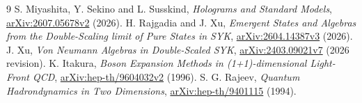\documentclass[11pt]{article}
\begin{document}
\begin{thebibliography}{9}
 S. Miyashita, Y. Sekino and L. Susskind,
\emph{Holograms and Standard Models},
\href{https://arxiv.org/abs/2607.05678v2}{arXiv:2607.05678v2} (2026).
 H. Rajgadia and J. Xu,
\emph{Emergent States and Algebras from the Double-Scaling limit of
Pure States in SYK},
\href{https://arxiv.org/abs/2604.14387v3}{arXiv:2604.14387v3} (2026).
 J. Xu, \emph{Von Neumann Algebras in Double-Scaled SYK},
\href{https://arxiv.org/abs/2403.09021v7}{arXiv:2403.09021v7} (2026 revision).
 K. Itakura,
\emph{Boson Expansion Methods in (1+1)-dimensional Light-Front QCD},
\href{https://arxiv.org/abs/hep-th/9604032v2}{arXiv:hep-th/9604032v2} (1996).
 S. G. Rajeev, \emph{Quantum Hadrondynamics in Two Dimensions},
\href{https://arxiv.org/abs/hep-th/9401115}{arXiv:hep-th/9401115} (1994).
\end{thebibliography}
\end{document}
